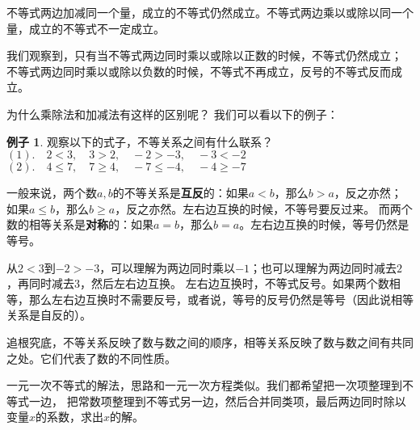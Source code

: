 \documentclass[12pt,UTF8]{ctexbook}
\theoremstyle{definition}
\newtheorem{ex}{例子}[section]
\theoremstyle{plain}
\begin{document}
不等式两边加减同一个量，成立的不等式仍然成立。不等式两边乘以或除以同一个量，成立的不等式不一定成立。

我们观察到，只有当不等式两边同时乘以或除以正数的时候，不等式仍然成立；
不等式两边同时乘以或除以负数的时候，不等式不再成立，反号的不等式反而成立。

为什么乘除法和加减法有这样的区别呢？
我们可以看以下的例子：
\begin{ex}\label{ex:4-1-20}
    观察以下的式子，不等关系之间有什么联系？\\
    $(1).\quad 2 < 3, \quad 3 > 2, \quad -2 > -3, \quad -3 < -2$ \\
    $(2). \quad 4 \leqslant 7, \quad 7 \geqslant 4, \quad -7 \leqslant -4, \quad -4 \geqslant -7$
\end{ex}
一般来说，两个数$a,b$的不等关系是\textbf{互反}的：如果$a < b$，那么$b > a$，反之亦然；
如果$a \leqslant b$，那么$b \geqslant a$，反之亦然。左右边互换的时候，不等号要反过来。
而两个数的相等关系是\textbf{对称}的：如果$a = b$，那么$b = a$。左右边互换的时候，等号仍然是等号。

从$2 < 3$到$-2 > -3$，可以理解为两边同时乘以$-1$；也可以理解为两边同时减去$2$，再同时减去$3$，然后左右边互换。
左右边互换时，不等式反号。如果两个数相等，那么左右边互换时不需要反号，或者说，等号的反号仍然是等号（因此说相等关系是自反的）。

追根究底，不等关系反映了数与数之间的顺序，相等关系反映了数与数之间有共同之处。它们代表了数的不同性质。

一元一次不等式的解法，思路和一元一次方程类似。我们都希望把一次项整理到不等式一边，
把常数项整理到不等式另一边，然后合并同类项，最后两边同时除以变量$x$的系数，求出$x$的解。
\end{document}
